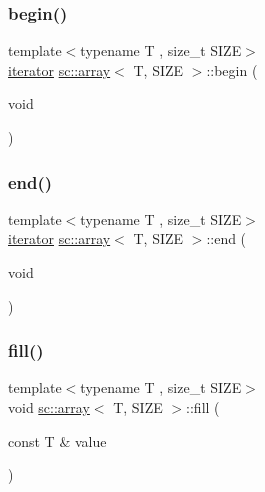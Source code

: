 \mbox{\label{classsc_1_1array_a3fd930db6e110a2e65784493d744fb8e}} 
\subsubsection{\texorpdfstring{begin()}{begin()}}
{\footnotesize\ttfamily template$<$typename T , size\+\_\+t S\+I\+ZE$>$ \\
\hyperlink{classsc_1_1array_1_1iterator}{iterator} \hyperlink{classsc_1_1array}{sc\+::array}$<$ T, S\+I\+ZE $>$\+::begin (\begin{DoxyParamCaption}\item[{void}]{ }\end{DoxyParamCaption})\hspace{0.3cm}{\ttfamily [inline]}}

\mbox{\label{classsc_1_1array_a9aa072f30e0000c8ed913207a1904bc9}} 
\subsubsection{\texorpdfstring{end()}{end()}}
{\footnotesize\ttfamily template$<$typename T , size\+\_\+t S\+I\+ZE$>$ \\
\hyperlink{classsc_1_1array_1_1iterator}{iterator} \hyperlink{classsc_1_1array}{sc\+::array}$<$ T, S\+I\+ZE $>$\+::end (\begin{DoxyParamCaption}\item[{void}]{ }\end{DoxyParamCaption})\hspace{0.3cm}{\ttfamily [inline]}}

\mbox{\label{classsc_1_1array_a7d551e257cf8b7f7fdcc92693ea06bf0}} 
\subsubsection{\texorpdfstring{fill()}{fill()}}
{\footnotesize\ttfamily template$<$typename T , size\+\_\+t S\+I\+ZE$>$ \\
void \hyperlink{classsc_1_1array}{sc\+::array}$<$ T, S\+I\+ZE $>$\+::fill (\begin{DoxyParamCaption}\item[{const T \&}]{value }\end{DoxyParamCaption})\hspace{0.3cm}{\ttfamily [inline]}}

